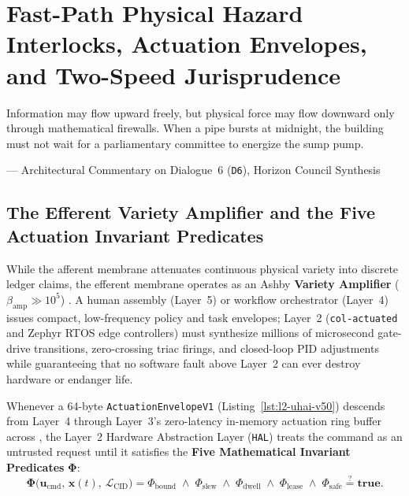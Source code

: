 \chapter{Fast-Path Physical Hazard Interlocks, Actuation Envelopes, and Two-Speed Jurisprudence}
\label{ch:fast-path-hazard-interlocks}

\epigraph{Information may flow upward freely, but physical force may flow downward only through mathematical firewalls. When a pipe bursts at midnight, the building must not wait for a parliamentary committee to energize the sump pump.}{--- Architectural Commentary on Dialogue~6 (\texttt{D6}), Horizon Council Synthesis}

\section{The Efferent Variety Amplifier and the Five Actuation Invariant Predicates}
\label{sec:l2-five-actuation-predicates}

While the afferent membrane attenuates continuous physical variety into discrete ledger claims, the efferent membrane operates as an Ashby \textbf{Variety Amplifier} ($\beta_{\mathrm{amp}} \gg 10^5$) \parencite{ashby1956}. A human assembly (Layer~5) or workflow orchestrator (Layer~4) issues compact, low-frequency policy and task envelopes; Layer~2 (\texttt{col-actuated} and Zephyr RTOS edge controllers) must synthesize millions of microsecond gate-drive transitions, zero-crossing triac firings, and closed-loop PID adjustments while guaranteeing that no software fault above Layer~2 can ever destroy hardware or endanger life.

Whenever a 64-byte \texttt{ActuationEnvelopeV1} (Listing~\ref{lst:l2-uhai-v50}) descends from Layer~4 through Layer~3's zero-latency in-memory actuation ring buffer across , the Layer~2 Hardware Abstraction Layer (\texttt{HAL}) treats the command as an untrusted request until it satisfies the \textbf{Five Mathematical Invariant Predicates} $\mathbf{\Phi}$:
\begin{equation}
    \mathbf{\Phi}\bigl(\mathbf{u}_{\mathrm{cmd}},\, \mathbf{x}(t),\, \mathcal{L}_{\mathrm{CID}}\bigr) = \Phi_{\mathrm{bound}} \;\land\; \Phi_{\mathrm{slew}} \;\land\; \Phi_{\mathrm{dwell}} \;\land\; \Phi_{\mathrm{lease}} \;\land\; \Phi_{\mathrm{safe}} \stackrel{?}{=} \mathbf{true}.
    \label{eq:l2-composite-phi}
\end{equation}

